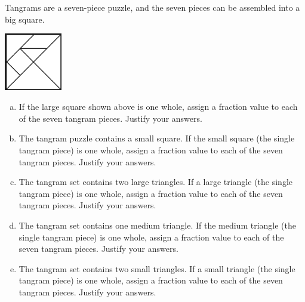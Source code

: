 \begin{problem}[Tangrams]
Tangrams are  a seven-piece puzzle, and  the seven pieces can be assembled into a big square.

\begin{center}
\includegraphics[height=2.5cm]{tangramsquare}
\end{center}


\begin{enumerate} [(a)]
 \item
If the large square shown above is one whole, assign a fraction value to each of the seven tangram pieces.  Justify your answers. \\

 
\item
The tangram puzzle contains a small square.  If the small square (the single tangram piece)  is one whole, assign a fraction value to each of the seven tangram pieces.  Justify your answers. \\


 \item
The tangram set contains two large triangles.  If a large triangle (the single tangram piece)  is one whole, assign a fraction value to each of the seven tangram pieces.  Justify your answers. \\



 \item
The tangram set contains one medium triangle.  If the medium triangle (the single tangram piece)  is one whole, assign a fraction value to each of the seven tangram pieces.  Justify your answers. \\
 


 \item
The tangram set contains two small triangles.  If a small triangle (the single tangram piece)  is one whole, assign a fraction value to each of the seven tangram pieces.  Justify your answers. \\
 



 \end{enumerate}
 \end{problem}



